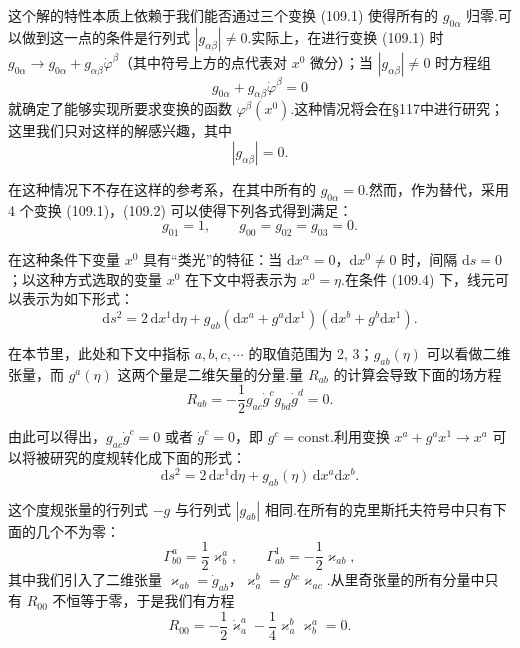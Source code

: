 这个解的特性本质上依赖于我们能否通过三个变换 (109.1) 使得所有的 $g_{0\alpha}$ 归零.可以做到这一点的条件是行列式 $|g_{\alpha\beta}|\neq0$.实际上，在进行变换 (109.1) 时 $g_{0\alpha}\to g_{0\alpha}+g_{\alpha\beta}\dot{\varphi}^{\beta}$（其中符号上方的点代表对 $x^{0}$ 微分）；当 $|g_{\alpha\beta}|\neq0$ 时方程组
\begin{equation*}
  g_{0\alpha}+g_{\alpha\beta}\dot{\varphi}^{\beta}=0
\end{equation*}
就确定了能够实现所要求变换的函数 $\varphi^{\beta}(x^{0})$.这种情况将会在§117中进行研究；这里我们只对这样的解感兴趣，其中
\begin{equation}
  |g_{\alpha\beta}|=0.
\end{equation}

在这种情况下不存在这样的参考系，在其中所有的 $g_{0\alpha}=0$.然而，作为替代，采用 4 个变换 (109.1)，(109.2) 可以使得下列各式得到满足：
\begin{equation}
  g_{01}=1,\qquad g_{00}=g_{02}=g_{03}=0.
\end{equation}

在这种条件下变量 $x^{0}$ 具有“类光”的特征：当 $\mathrm{d}x^{\alpha}=0$，$\mathrm{d}x^{0}\neq0$ 时，间隔 $\mathrm{d}s=0$；以这种方式选取的变量 $x^{0}$ 在下文中将表示为 $x^{0}=\eta$.在条件 (109.4) 下，线元可以表示为如下形式：
\begin{equation}
  \mathrm{d}s^{2}=2\,\mathrm{d}x^{1}\mathrm{d}\eta
  +g_{ab}(\mathrm{d}x^{a}+g^{a}\mathrm{d}x^{1})
  (\mathrm{d}x^{b}+g^{b}\mathrm{d}x^{1}).
\end{equation}

在本节里，此处和下文中指标 $a,b,c,\cdots$ 的取值范围为 2, 3；$g_{ab}(\eta)$ 可以看做二维张量，而 $g^{a}(\eta)$ 这两个量是二维矢量的分量.量 $R_{ab}$ 的计算会导致下面的场方程
\begin{equation*}
  R_{ab}=-\frac{1}{2}g_{ac}\dot{g}^{c}g_{bd}\dot{g}^{d}=0.
\end{equation*}

由此可以得出，$g_{ac}\dot{g}^{c}=0$ 或者 $\dot{g}^{c}=0$，即 $g^{c}=\mathrm{const}$.利用变换 $x^{a}+g^{a}x^{1}\to x^{a}$ 可以将被研究的度规转化成下面的形式：
\begin{equation}
  \mathrm{d}s^{2}=2\,\mathrm{d}x^{1}\mathrm{d}\eta
  +g_{ab}(\eta)\,\mathrm{d}x^{a}\mathrm{d}x^{b}.
\end{equation}

这个度规张量的行列式 $-g$ 与行列式 $|g_{ab}|$ 相同.在所有的克里斯托夫符号中只有下面的几个不为零：
\begin{equation*}
  \Gamma_{b0}^{a}=\frac{1}{2}\varkappa_b^a,
  \qquad
  \Gamma_{ab}^{1}=-\frac{1}{2}\varkappa_{ab},
\end{equation*}
其中我们引入了二维张量 $\varkappa_{ab}=\dot{g}_{ab}$，$\varkappa_a^b=g^{bc}\varkappa_{ac}$.从里奇张量的所有分量中只有 $R_{00}$ 不恒等于零，于是我们有方程
\begin{equation}
  R_{00}=-\frac{1}{2}\dot{\varkappa}_a^a
  -\frac{1}{4}\varkappa_a^b\varkappa_b^a=0.
\end{equation}

